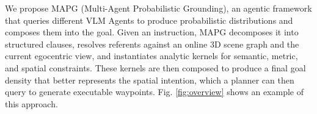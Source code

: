 
We propose MAPG (Multi-Agent Probabilistic Grounding), an agentic framework that queries different VLM Agents to produce probabilistic distributions and composes them into the goal. Given an instruction, MAPG decomposes it into structured clauses, resolves referents against an online $3$D scene graph and the current egocentric view, and instantiates analytic kernels for semantic, metric, and spatial constraints.
These kernels are then composed to produce a final goal density that better represents the spatial intention, which a planner can then query to generate executable waypoints.
Fig. \ref{fig:overview} shows an example of this approach.


